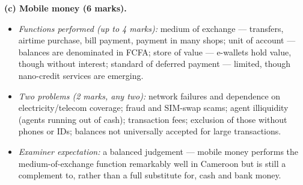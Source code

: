 \documentclass[11pt]{article}
\begin{document}
\begin{corrige}
\textbf{(c) Mobile money (6 marks).}
\begin{itemize}
\item \emph{Functions performed (up to 4 marks):} medium of exchange — transfers, airtime purchase, bill payment, payment in many shops; unit of account — balances are denominated in FCFA; store of value — e-wallets hold value, though without interest; standard of deferred payment — limited, though nano-credit services are emerging.
\item \emph{Two problems (2 marks, any two):} network failures and dependence on electricity/telecom coverage; fraud and SIM-swap scams; agent illiquidity (agents running out of cash); transaction fees; exclusion of those without phones or IDs; balances not universally accepted for large transactions.
\item \emph{Examiner expectation:} a balanced judgement — mobile money performs the medium-of-exchange function remarkably well in Cameroon but is still a complement to, rather than a full substitute for, cash and bank money.
\end{itemize}
\end{corrige}
\end{document}

